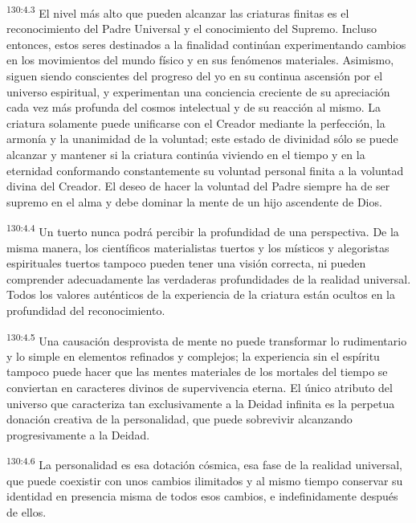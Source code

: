 \par 
\textsuperscript{130:4.3} El nivel más alto que pueden alcanzar las criaturas finitas es el reconocimiento del Padre Universal y el conocimiento del Supremo. Incluso entonces, estos seres destinados a la finalidad continúan experimentando cambios en los movimientos del mundo físico y en sus fenómenos materiales. Asimismo, siguen siendo conscientes del progreso del yo en su continua ascensión por el universo espiritual, y experimentan una conciencia creciente de su apreciación cada vez más profunda del cosmos intelectual y de su reacción al mismo. La criatura solamente puede unificarse con el Creador mediante la perfección, la armonía y la unanimidad de la voluntad; este estado de divinidad sólo se puede alcanzar y mantener si la criatura continúa viviendo en el tiempo y en la eternidad conformando constantemente su voluntad personal finita a la voluntad divina del Creador. El deseo de hacer la voluntad del Padre siempre ha de ser supremo en el alma y debe dominar la mente de un hijo ascendente de Dios.

\par 
\textsuperscript{130:4.4} Un tuerto nunca podrá percibir la profundidad de una perspectiva. De la misma manera, los científicos materialistas tuertos y los místicos y alegoristas espirituales tuertos tampoco pueden tener una visión correcta, ni pueden comprender adecuadamente las verdaderas profundidades de la realidad universal. Todos los valores auténticos de la experiencia de la criatura están ocultos en la profundidad del reconocimiento.

\par 
\textsuperscript{130:4.5} Una causación desprovista de mente no puede transformar lo rudimentario y lo simple en elementos refinados y complejos; la experiencia sin el espíritu tampoco puede hacer que las mentes materiales de los mortales del tiempo se conviertan en caracteres divinos de supervivencia eterna. El único atributo del universo que caracteriza tan exclusivamente a la Deidad infinita es la perpetua donación creativa de la personalidad, que puede sobrevivir alcanzando progresivamente a la Deidad.

\par 
\textsuperscript{130:4.6} La personalidad es esa dotación cósmica, esa fase de la realidad universal, que puede coexistir con unos cambios ilimitados y al mismo tiempo conservar su identidad en presencia misma de todos esos cambios, e indefinidamente después de ellos.

